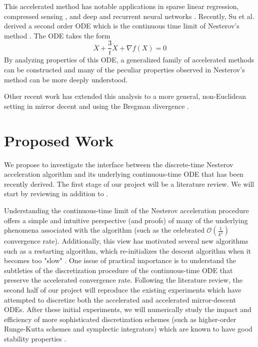 \documentclass{article}
\begin{document}
This accelerated method has notable applications in sparse linear regression\cite{beck2009fast}\cite{qin2012structured}, compressed sensing \cite{becker2011nesta}, and deep and recurrent neural networks \cite{sutskever2013importance}. Recently, Su et al. derived a second order ODE which is the continuous time limit of Nesterov's method \cite{su2014differential}. The ODE takes the form
\[ \ddot{X} + \frac{3}{t} \dot{X} + \nabla f(X) = 0 \]
By analyzing properties of this ODE, a generalized family of accelerated methods can be constructed and many of the peculiar properties observed in Nesterov's method can be more deeply understood. 

Other recent work has extended this analysis to a more general, non-Euclidean setting in mirror decent and using the Bregman divergence \cite{wibisono2016variational, krichene2015accelerated}. 

\section{Proposed Work}
We propose to investigate the interface between the discrete-time Nesterov acceleration algorithm and its underlying continuous-time ODE that has been recently derived. The first stage of our project will be a literature review. We will start by reviewing \cite{su2014differential, wibisono2016variational, krichene2015accelerated} in addition to \cite{DBLP:journals/ftml/Bubeck15}. 

Understanding the continuous-time limit of the Nesterov acceleration procedure offers a simple and intuitive perspective (and proofs) of many of the underlying phenomena associated with the algorithm (such as the celebrated $\mathcal{O}(\frac{1}{k^2})$ convergence rate). Additionally, this view has motivated several new algorithms such as a restarting algorithm, which re-initializes the descent algorithm when it becomes too "slow" \cite{su2014differential}. 
One issue of practical importance is to understand the subtleties of the discretization procedure of the continuous-time ODE that preserve the accelerated convergence rate. Following the literature review, the second half of our project will reproduce the existing experiments which have attempted to discretize both the accelerated and accelerated mirror-descent ODEs. After these initial experiments, we will numerically study the impact and efficiency of more sophisticated discretization schemes (such as higher-order Runge-Kutta schemes and symplectic integrators) which are known to have good stability properties \cite{hairer2006geometric}. 




\end{document}
